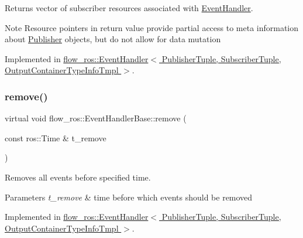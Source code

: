 Returns vector of subscriber resources associated with \hyperlink{classflow__ros_1_1_event_handler}{Event\+Handler}. 

\begin{DoxyNote}{Note}
Resource pointers in return value provide partial access to meta information about \hyperlink{classflow__ros_1_1_publisher}{Publisher} objects, but do not allow for data mutation 
\end{DoxyNote}


Implemented in \hyperlink{classflow__ros_1_1_event_handler_ac91cf67be38d79d3d86a9aa6318eca53}{flow\+\_\+ros\+::\+Event\+Handler$<$ Publisher\+Tuple, Subscriber\+Tuple, Output\+Container\+Type\+Info\+Tmpl $>$}.

\mbox{\label{classflow__ros_1_1_event_handler_base_a73c65bda396f3d8606e64487a7b30a76}} 
\subsubsection{\texorpdfstring{remove()}{remove()}}
{\footnotesize\ttfamily virtual void flow\+\_\+ros\+::\+Event\+Handler\+Base\+::remove (\begin{DoxyParamCaption}\item[{const ros\+::\+Time \&}]{t\+\_\+remove }\end{DoxyParamCaption})\hspace{0.3cm}{\ttfamily [pure virtual]}}



Removes all events before specified time. 


\begin{DoxyParams}{Parameters}
{\em t\+\_\+remove} & time before which events should be removed \\
\hline
\end{DoxyParams}


Implemented in \hyperlink{classflow__ros_1_1_event_handler_aeaf45592fd8c7fe8c3a4b0da23496d69}{flow\+\_\+ros\+::\+Event\+Handler$<$ Publisher\+Tuple, Subscriber\+Tuple, Output\+Container\+Type\+Info\+Tmpl $>$}.

\mbox{\label{classflow__ros_1_1_event_handler_base_a5a4d9baa42d26f4d639b69ebbcc2aa0a}} 
